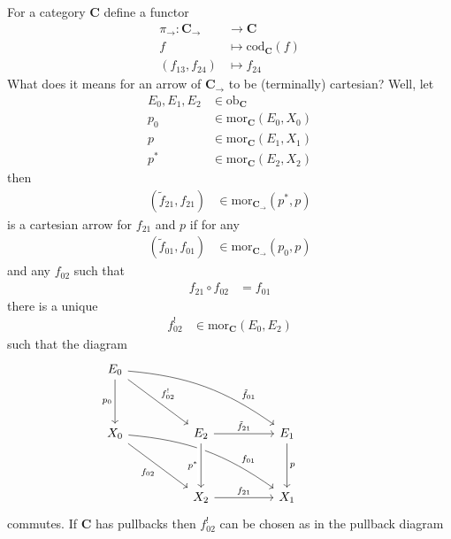 \begin{exa}
\label{exa:catofarrpb}
For a category $\mathbf{C}$ define a functor
\begin{align*}
  \pi_{\rightarrow}
  \colon
  \mathbf{C}_{\rightarrow}
  &\rightarrow
  \mathbf{C}
  \\
  f
  &\mapsto
  \mathrm{cod}_{\mathbf{C}}(f)
  \\
  (f_{13},f_{24})
  &\mapsto
  f_{24}
\end{align*}
What does it means for an arrow of $\mathbf{C}_{\rightarrow}$ to be (terminally) cartesian? Well, let
\begin{align*}
  E_{0},
  E_{1},
  E_{2}
  &\in
  \mathrm{ob}_{\mathbf{C}}
  \\
  p_{0}
  &\in
  \mathrm{mor}_{\mathbf{C}}(E_{0},X_{0})
  \\
  p
  &\in
  \mathrm{mor}_{\mathbf{C}}(E_{1},X_{1})
  \\
  p^{\ast}
  &\in
  \mathrm{mor}_{\mathbf{C}}(E_{2},X_{2})
\end{align*}
then
\begin{align*}
  (\tilde{f}_{21},f_{21})
  &\in
  \mathrm{mor}_{\mathbf{C}_{\rightarrow}}(p^{\ast},p)
\end{align*}
is a cartesian arrow for $f_{21}$ and $p$ if for any
\begin{align*}
  (\tilde{f}_{01},f_{01})
  &\in
  \mathrm{mor}_{\mathbf{C}_{\rightarrow}}(p_{0},p)
\end{align*}
and any $f_{02}$ such that
\begin{align*}
  f_{21}
  \circ
  f_{02}
  &=
  f_{01}
\end{align*}
there is a unique
\begin{align*}
  f_{02}^{!}
  &\in
  \mathrm{mor}_{\mathbf{C}}(E_{0},E_{2})
\end{align*}
such that the diagram
\[
\begin{tikzcd}[sep=huge]
  E_{0}
  \arrow[bend left=15,near end]{drr}{\tilde{f}_{01}}
  \arrow{dr}{f_{02}^{!}}
  \arrow[swap]{d}{p_{0}}
  &
  &
  &
  \\
  X_{0}
  \arrow[bend left=15,near end]{drr}{f_{01}}
  \arrow[swap]{dr}{f_{02}}
  &
  E_{2}
  \arrow{r}{\tilde{f}_{21}}
  \arrow[swap,crossing over]{d}{p^{\ast}}
  &
  E_{1}
  \arrow{d}{p}
  \\
  &
  X_{2}
  \arrow{r}{f_{21}}
  &
  X_{1}
\end{tikzcd}
\]
commutes. If $\mathbf{C}$ has pullbacks then $f_{02}^{!}$ can be chosen as in the pullback diagram
\[
\begin{tikzcd}[sep=huge]

\end{tikzcd}\]
\end{exa}
